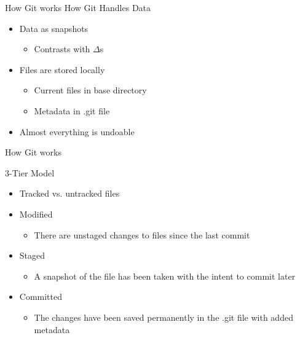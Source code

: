 \documentclass[xcolor=dvipsnames]{beamer}
\begin{document}
\begin{frame}{How Git works}
\vspace{-10mm}
{\LARGE How Git Handles Data}

\begin{itemize}
\item Data as snapshots
\begin{itemize}
\item Contrasts with $\Delta$s
\end{itemize}
\item Files are stored locally
\begin{itemize}
\item Current files in base directory
\item Metadata in .git file
\end{itemize}
\item Almost everything is undoable
\end{itemize}

\end{frame}

\begin{frame}{How Git works}

{\LARGE 3-Tier Model}\\
\begin{itemize}
\item Tracked vs. untracked files

\item {\large Modified}
\begin{itemize}
\item There are unstaged changes to files since the last commit
\end{itemize}

\item {\large Staged}
\begin{itemize}
\item A snapshot of the file has been taken with the intent to commit later
\end{itemize}
\item {\large Committed}
\begin{itemize}
\item The changes have been saved permanently in the .git file with added metadata
\end{itemize}
\end{itemize}


\end{frame}
\end{document}
